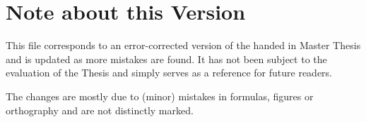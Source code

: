 \chapter{Note about this Version}
This file corresponds to an error-corrected version of the handed in Master Thesis and is updated as more mistakes are found.
It has not been subject to the evaluation of the Thesis and simply serves as a reference for future readers.

The changes are mostly due to (minor) mistakes in formulas, figures or orthography and are not distinctly marked.